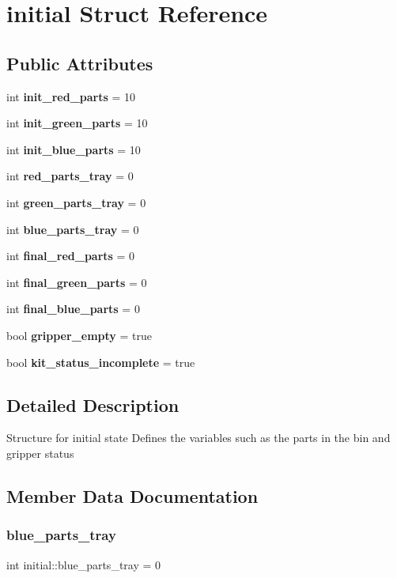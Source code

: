 \section{initial Struct Reference}
\label{structinitial}
\subsection*{Public Attributes}
\begin{DoxyCompactItemize}
\item 
int \textbf{ init\+\_\+red\+\_\+parts} = 10
\item 
int \textbf{ init\+\_\+green\+\_\+parts} = 10
\item 
int \textbf{ init\+\_\+blue\+\_\+parts} = 10
\item 
int \textbf{ red\+\_\+parts\+\_\+tray} = 0
\item 
int \textbf{ green\+\_\+parts\+\_\+tray} = 0
\item 
int \textbf{ blue\+\_\+parts\+\_\+tray} = 0
\item 
int \textbf{ final\+\_\+red\+\_\+parts} = 0
\item 
int \textbf{ final\+\_\+green\+\_\+parts} = 0
\item 
int \textbf{ final\+\_\+blue\+\_\+parts} = 0
\item 
bool \textbf{ gripper\+\_\+empty} = true
\item 
bool \textbf{ kit\+\_\+status\+\_\+incomplete} = true
\end{DoxyCompactItemize}


\subsection{Detailed Description}
Structure for initial state Defines the variables such as the parts in the bin and gripper status 

\subsection{Member Data Documentation}
\mbox{\label{structinitial_a3d5a8fdba51992eddf92448629168c8f}} 
\subsubsection{blue\+\_\+parts\+\_\+tray}
{\footnotesize\ttfamily int initial\+::blue\+\_\+parts\+\_\+tray = 0}

